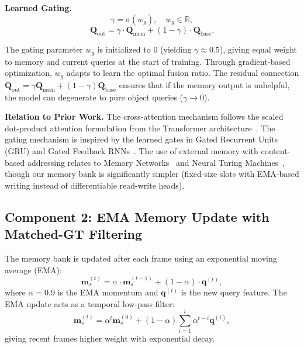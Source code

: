 \textbf{Learned Gating.}
\begin{equation}
\gamma = \sigma(w_g), \quad w_g \in \mathbb{R},
\end{equation}
\begin{equation}
\mathbf{Q}_{\mathrm{out}} = \gamma \cdot \mathbf{Q}_{\mathrm{mem}} + (1-\gamma) \cdot \mathbf{Q}_{\mathrm{base}}.
\end{equation}

The gating parameter $w_g$ is initialized to $0$ (yielding $\gamma \approx 0.5$), giving equal weight to memory and current queries at the start of training. Through gradient-based optimization, $w_g$ adapts to learn the optimal fusion ratio. The residual connection $\mathbf{Q}_{\mathrm{out}} = \gamma \mathbf{Q}_{\mathrm{mem}} + (1-\gamma) \mathbf{Q}_{\mathrm{base}}$ ensures that if the memory output is unhelpful, the model can degenerate to pure object queries ($\gamma \to 0$).

\textbf{Relation to Prior Work.}
The cross-attention mechanism follows the scaled dot-product attention formulation from the Transformer architecture~\cite{vaswani2017attention}. The gating mechanism is inspired by the learned gates in Gated Recurrent Units (GRU) and Gated Feedback RNNs~\cite{chung2015gated,chung2014empirical}. The use of external memory with content-based addressing relates to Memory Networks~\cite{weston2015memory} and Neural Turing Machines~\cite{graves2014neural}, though our memory bank is significantly simpler (fixed-size slots with EMA-based writing instead of differentiable read-write heads).

\subsection{Component 2: EMA Memory Update with Matched-GT Filtering}

The memory bank is updated after each frame using an exponential moving average (EMA):
\begin{equation}
\mathbf{m}_s^{(t)} = \alpha \cdot \mathbf{m}_s^{(t-1)} + (1-\alpha) \cdot \mathbf{q}^{(t)},
\end{equation}
where $\alpha = 0.9$ is the EMA momentum and $\mathbf{q}^{(t)}$ is the new query feature. The EMA update acts as a temporal low-pass filter:
\begin{equation}
\mathbf{m}_s^{(t)} = \alpha^t \mathbf{m}_s^{(0)} + (1-\alpha) \sum_{i=1}^{t} \alpha^{t-i} \mathbf{q}^{(i)},
\end{equation}
giving recent frames higher weight with exponential decay.


